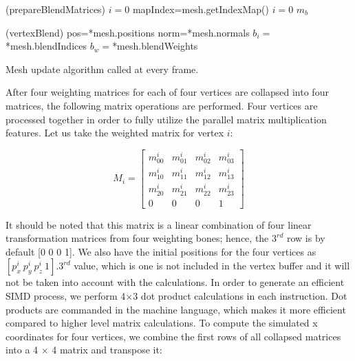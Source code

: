 \begin{algorithm}[ht]
\DontPrintSemicolon %
\function(prepareBlendMatrices){
$i=0$\;
\;
mapIndex=mesh.getIndexMap() 
$i=0$\;
\;
\Return $m_b$\;
}

\function(vertexBlend){
pos=*mesh.positions\;
norm=*mesh.normals\;
$b_i=$*mesh.blendIndices\;
$b_w=$*mesh.blendWeights\;
}
\caption{Mesh update algorithm called at every frame.}
\label{algo:updateMesh}
\end{algorithm}

After four weighting matrices for each of four vertices are collapsed into four matrices, the following matrix operations are performed. Four vertices are processed together in order to fully utilize the parallel matrix multiplication features. Let us take the weighted matrix for vertex $i$:

\begin{equation}
M_i=
\begin{bmatrix}
m_{00}^i & m_{01}^i & m_{02}^i & m_{03}^i \\
m_{10}^i & m_{11}^i & m_{12}^i & m_{13}^i \\
m_{20}^i & m_{21}^i & m_{22}^i & m_{23}^i \\
0 & 0 & 0 & 1
\end{bmatrix}
\label{eqn:weighted_matrix_for_i}
\end{equation}

It should be noted that this matrix is a linear combination of four linear transformation matrices from four weighting bones; hence, the $3^{rd}$ row is by default [0 0 0 1]. We also have the initial positions for the four vertices as $[p^i_x \: p^i_y  \: p^i_z  \: 1]$.$3^{rd}$ value, which is one is not included in the vertex buffer and it will not be taken into account with the calculations. In order to generate an efficient SIMD process, we perform 4$\times$3 dot product calculations in each instruction. Dot products are commanded in the machine language, which makes it more efficient compared to higher level matrix calculations. To compute the simulated x coordinates for  four vertices, we combine the first rows of all collapsed matrices into a 4 $\times$ 4 matrix and transpose it:

